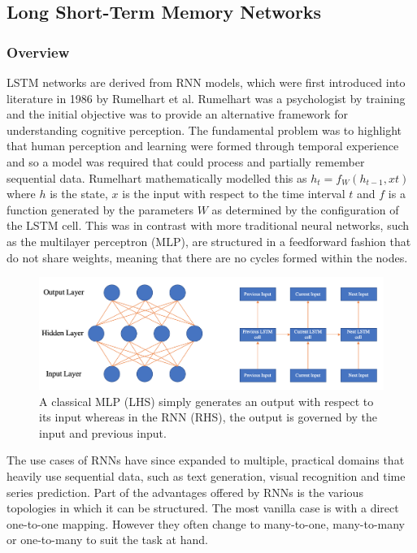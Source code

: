 \documentclass[10pt,onecolumn,letterpaper]{article}
\begin{document}
\subsection{Long Short-Term Memory Networks} \label{lstm}

\subsubsection{Overview} 

LSTM networks are derived from RNN models, which were first introduced into literature\cite{Rumelhart} in 1986 by Rumelhart et al. Rumelhart was a psychologist by training and the initial objective was to provide an alternative framework for understanding cognitive perception. The fundamental problem was to highlight that human perception and learning were formed through temporal experience and so a model was required that could process and partially remember sequential data. Rumelhart mathematically modelled this as $h_{t} = f_{W} (h_{t-1}, x{t})$ where $h$ is the state, $x$ is the input with respect to the time interval $t$ and $f$ is a function generated by the parameters $W$ as determined by the configuration of the LSTM cell. This was in contrast with more traditional neural networks, such as the multilayer perceptron (MLP), are structured in a feedforward fashion that do not share weights, meaning that there are no cycles formed within the nodes. 

\begin{figure}[!hbt!]
\centering
\includegraphics[width=17.5cm]{mlp_rnn_comparison.png}
\caption{A classical MLP (LHS) simply generates an output with respect to its input whereas in the RNN (RHS), the output is governed by the input and previous input.}
\end{figure}

The use cases of RNNs have since expanded to multiple, practical domains that heavily use sequential data, such as text generation, visual recognition and time series prediction. Part of the advantages offered by RNNs is the various topologies in which it can be structured. The most vanilla case is with a direct one-to-one mapping. However they often change to many-to-one, many-to-many or one-to-many to suit the task at hand. 
\end{document}
